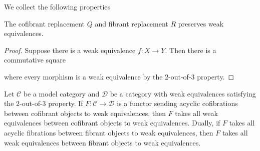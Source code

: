 \documentclass[../thesis.tex]{subfiles}
\begin{document}
            We collect the following properties

            \begin{lemma}\label{lem: Q-preserves-weak}
                The cofibrant replacement $Q$ and fibrant replacement $R$ preserves weak equivalences. 
            \end{lemma}

            \begin{proof}
                Suppose there is a weak equivalence $f : X \rightarrow Y$. Then there is a commutative square
                \begin{center}
                \end{center}
                where every morphism is a weak equivalence by the $2$-out-of-$3$ property.
            \end{proof}

            \begin{lemma}\label{lem: Ken-Brown}
                Let $\mathcal{C}$ be a model category and $\mathcal{D}$ be a category with weak equivalences satisfying the $2$-out-of-$3$ property. If $F:\mathcal{C} \rightarrow \mathcal{D}$ is a functor sending acyclic cofibrations between cofibrant objects to weak equivalences, then $F$ takes all weak equivalences between cofibrant objects to weak equivalences. Dually, if $F$ takes all acyclic fibrations between fibrant objects to weak equivalences, then $F$ takes all weak equivalences between fibrant objects to weak equivalences.
            \end{lemma}
\end{document}
